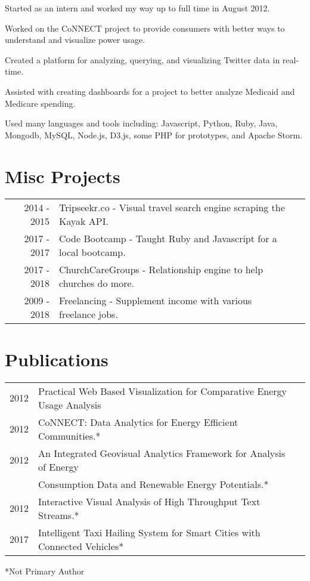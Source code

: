 \documentclass[]{deedy-resume-openfont}
\begin{document}
\begin{minipage}[t]{0.66\textwidth}
\begin{tightemize}
\item Started as an intern and worked my way up to full time in August 2012.
\item Worked on the CoNNECT project to provide consumers with better ways to understand and visualize power usage.
\item Created a platform for analyzing, querying, and visualizing Twitter data in real-time.
\item Assisted with creating dashboards for a project to better analyze Medicaid and Medicare spending.
\item Used many languages and tools including: Javascript, Python, Ruby, Java, Mongodb, MySQL, Node.js, D3.js, some PHP for prototypes, and Apache Storm.
\end{tightemize}
\sectionsep


\section{Misc Projects} 

\begin{tabular}{rll}
2014 - 2015& Tripseekr.co - Visual travel search engine scraping the Kayak API.\\
2017 - 2017 & Code Bootcamp - Taught Ruby and Javascript for a local bootcamp.\\
2017 - 2018& ChurchCareGroups - Relationship engine to help churches do more.\\
2009 - 2018& Freelancing - Supplement income with various freelance jobs.\\
\end{tabular}
\sectionsep


\section{Publications} 

\begin{tabular}{rll}
2012& Practical Web Based Visualization for Comparative Energy Usage Analysis\\
2012& CoNNECT: Data Analytics for Energy Efficient Communities.*\\
2012& An Integrated Geovisual Analytics Framework for Analysis of Energy\\
&Consumption Data and Renewable Energy Potentials.*\\
2012& Interactive Visual Analysis of High Throughput Text Streams.*\\
2017& Intelligent Taxi Hailing System for Smart Cities with Connected Vehicles*
\end{tabular}
*Not Primary Author
\sectionsep

\end{minipage} 
\end{document}
